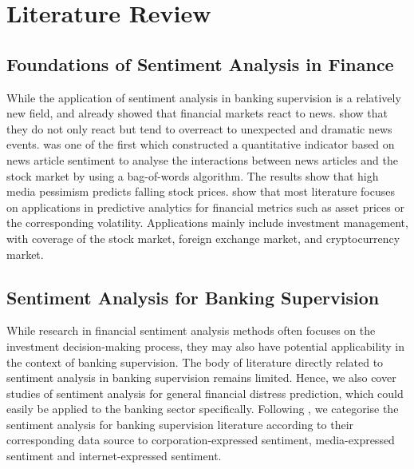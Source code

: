 \chapter{Literature Review}\label{sec3}
\thispagestyle{empty}



\section{Foundations of Sentiment Analysis in Finance}

While the application of sentiment analysis in banking supervision is a relatively new field, \cite{debondt1985} and \cite{cutler1988} already showed that financial markets react to news. \cite{debondt1985} show that they do not only react but tend to overreact to unexpected and dramatic news events. \cite{tetlock2007} was one of the first which constructed a quantitative indicator based on news article sentiment to analyse the interactions between news articles and the stock market by using a bag-of-words algorithm. The results show that high media pessimism predicts falling stock prices. \cite{du2024} show that most literature focuses on applications in predictive analytics for financial metrics such as asset prices or the corresponding volatility. Applications mainly include investment management, with coverage of the stock market, foreign exchange market, and cryptocurrency market.

\section{Sentiment Analysis for Banking Supervision}

While research in financial sentiment analysis methods often focuses on the investment decision-making process, they may also have potential applicability in the context of banking supervision. The body of literature directly related to sentiment analysis in banking supervision remains limited. Hence, we also cover studies of sentiment analysis for general financial distress prediction, which could easily be applied to the banking sector specifically. Following \cite{kearney2014}, we categorise the sentiment analysis for banking supervision literature according to their corresponding data source to corporation-expressed sentiment, media-expressed sentiment and internet-expressed sentiment. \\

